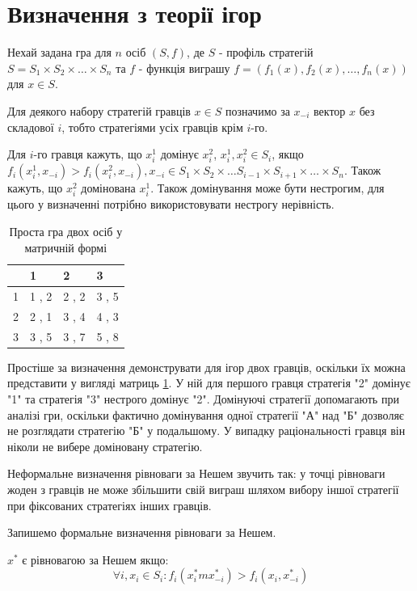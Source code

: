 \section{Визначення з теорії ігор}

Нехай задана гра для $n$ осіб $(S,f)$, де $S$ - профіль стратегій $S=S_1 \times S_2 \times \ldots \times S_n$ та $f$ - функція виграшу $f=(f_1(x),f_2(x), \ldots, f_n(x))$ для $x \in S$.

Для деякого набору стратегій гравців $x \in S$ позначимо за $x_{-i}$ вектор $x$ без складової $i$, тобто стратегіями усіх гравців крім $i$-го.

Для $i$-го гравця кажуть, що $x^1_i$ домінує $x^2_i$, $x^1_i, x^2_i \in S_i$, якщо $f_i(x^1_i, x_{-i}) > f_i(x^2_i, x_{-i}), x_{-i} \in S_1 \times S_2 \times \ldots S_{i-1} \times S_{i+1} \times \ldots \times S_n$. Також кажуть, що $x^2_i$ домінована $x^1_i$. Також домінування може бути нестрогим, для цього у визначенні потрібно використовувати нестрогу нерівність.

\begin{table}[H]
	\centering
	\label{table:simple_game}
	\caption{Проста гра двох осіб у матричній формі}
	\begin{tabular}{|p{1cm}|p{1cm}|p{1cm}|p{1cm}|}
		\hline
		        & 1     & 2     & 3
		\\ \hline
		1 		& 1 , 2 & 2 , 2 & 3 , 5
		\\ \hline
		2 		& 2 , 1 & 3 , 4 & 4 , 3
		\\ \hline
		3 		& 3 , 5 & 3 , 7 & 5 , 8
		\\ \hline
	\end{tabular}
\end{table}

Простіше за визначення демонструвати для ігор двох гравців, оскільки їх можна представити у вигляді матриць \ref{table:simple_game}. У ній для першого гравця стратегія "2" домінує "1" та стратегія "3" нестрого домінує "2". Домінуючі стратегії допомагають при аналізі гри, оскільки фактично домінування одної стратегії "А" над "Б" дозволяє не розглядати стратегію "Б" у подальшому. У випадку раціональності гравця він ніколи не вибере доміновану стратегію.

Неформальне визначення рівноваги за Нешем звучить так: у точці рівноваги жоден з гравців не може збільшити свій виграш шляхом вибору іншої стратегії при фіксованих стратегіях інших гравців.

Запишемо формальне визначення рівноваги за Нешем.

$x^*$ є рівновагою за Нешем якщо:
\begin{equation}
	\forall i, x_i \in S_i : f_i(x^*_im x^*_{-i}) > f_i(x_i, x^*_{-i})	
	\label{eq:nash_equilibrium_def}
\end{equation}

